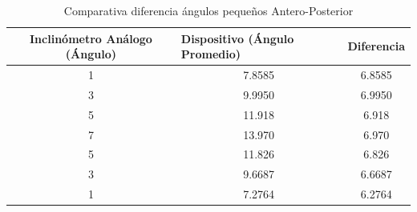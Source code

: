 \documentclass[12pt,a4paper]{article}
\begin{document}
\begin{table}[H]
	\centering
	\begin{tabular}{|c|c|c|}
		\hline
		\textbf{Inclinómetro Análogo (Ángulo)} & \multicolumn{1}{l|}{\textbf{Dispositivo (Ángulo Promedio)}} & Diferencia 				\\ \hline
		1                                      & 7.8585                                                      & 6.8585                     \\ \hline
		3                                      & 9.9950                                                      & 6.9950                    \\ \hline
		5                                      & 11.918                                                      & 6.918                     \\ \hline
		7                                      & 13.970                                                      & 6.970                     \\ \hline
		5                                      & 11.826                                                      & 6.826                      \\ \hline
		3                                      & 9.6687                                                      & 6.6687                     \\ \hline
		1                                      & 7.2764                                                      & 6.2764                     \\ \hline
	\end{tabular}
	\caption{Comparativa diferencia ángulos pequeños Antero-Posterior}
	\label{table:inclinometroVsDispositivoAP}
\end{table}
\end{document}
